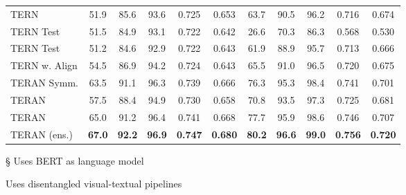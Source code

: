 \documentclass[acmsmall]{acmart}
\newcommand{\majorrevised}[1]{#1}
\begin{document}
\begin{table}[t]
\begin{threeparttable}
\begin{tabular}{LCCCCCCCCCC}
\midrule
TERN \cite{messina2020tern} & 51.9 & 85.6 & 93.6 & 0.725 & 0.653 & 63.7 & 90.5 & 96.2 & 0.716 & 0.674 \\
TERN Test & 51.5 & 84.9 & 93.1 & 0.722 & 0.642 & 26.6 & 70.3 & 86.3 &  0.568 & 0.530\\
TERN Test & 51.2 & 84.6 & 92.9 & 0.722 & 0.643 & 61.9 & 88.9 & 95.7 & 0.713 & 0.666 \\
TERN w. Align & 54.5 & 86.9 & 94.2 & 0.724 & 0.643 & 65.5 & 91.0 & 96.5 & 0.720 & 0.675\\
\midrule
TERAN Symm. & 63.5 & 91.1 & 96.3 & 0.739 & 0.666 & 76.3 & 95.3 & 98.4 & 0.741 & 0.701 \\
TERAN  & 57.5 & 88.4 & 94.9 & 0.730 & 0.658 & 70.8 & 93.5 & 97.3 & 0.725 & 0.681 \\
TERAN  & 65.0 & 91.2 & 96.4 & 0.741 & 0.668	& 77.7 & 95.9 & 98.6 & 0.746 & 0.707 \\
\majorrevised{TERAN  (ens.)} & \majorrevised{\textbf{67.0}} & \majorrevised{\textbf{92.2}} & \majorrevised{\textbf{96.9}} & \majorrevised{\textbf{0.747}} & \majorrevised{\textbf{0.680}} & \majorrevised{\textbf{80.2}} & \majorrevised{\textbf{96.6}} & \majorrevised{\textbf{99.0}} & \majorrevised{\textbf{0.756}} & \majorrevised{\textbf{0.720}} \\
\bottomrule
\end{tabular}
\label{tab:results_mscoco_1k}
\begin{tablenotes}
    \item[\S] Uses BERT as language model
    \item[\textdagger] Uses disentangled visual-textual pipelines
\end{tablenotes}
\end{threeparttable}
\end{table}
\end{document}
